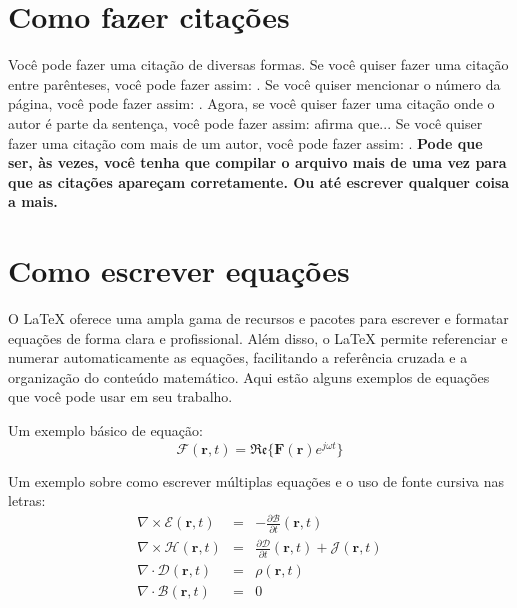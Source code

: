 
	\chapter{Como fazer citações}

		Você pode fazer uma citação de diversas formas. Se você quiser fazer uma citação entre parênteses, você pode fazer assim: \citep{milgram1969note}. Se você quiser mencionar o número da página, você pode fazer assim: \citep[p. 10]{deb2002fast}. Agora, se você quiser fazer uma citação onde o autor é parte da sentença, você pode fazer assim: \cite{maxwell1865viii} afirma que... Se você quiser fazer uma citação com mais de um autor, você pode fazer assim: \citep{van2019fantastic,maxwell1865viii}. \textbf{Pode que ser, às vezes, você tenha que compilar o arquivo mais de uma vez para que as citações apareçam corretamente. Ou até escrever qualquer coisa a mais.}
	
	\chapter{Como escrever equações}

		O LaTeX oferece uma ampla gama de recursos e pacotes para escrever e formatar equações de forma clara e profissional. Além disso, o LaTeX permite referenciar e numerar automaticamente as equações, facilitando a referência cruzada e a organização do conteúdo matemático. Aqui estão alguns exemplos de equações que você pode usar em seu trabalho.

		Um exemplo básico de equação:
		\begin{equation}
			\boldsymbol{\mathcal{F}}(\mathbf{r}, t) = \mathfrak{Re}\{\mathbf{F}(\mathbf{r})e^{j\omega t}\} \label{eq:2:fourier}
		\end{equation}

		Um exemplo sobre como escrever múltiplas equações e o uso de fonte cursiva nas letras:
		\begin{eqnarray}
			\nabla\times\boldsymbol{\mathcal{E}}(\mathbf{r}, t) &=& - \frac{\partial\boldsymbol{ \mathcal{B}}}{\partial t}(\mathbf{r}, t) \label{eq:2:maxwell:time:1} \\
			\nabla\times\boldsymbol{\mathcal{H}}(\mathbf{r}, t) &=& \frac{\partial\boldsymbol{ \mathcal{D}}}{\partial t}(\mathbf{r}, t) + \boldsymbol{\mathcal{J}}(\mathbf{r}, t) \label{eq:2:maxwell:time:2} \\
			\nabla\cdot\boldsymbol{\mathcal{D}}(\mathbf{r}, t) &=& \rho(\mathbf{r}, t) \label{eq:2:maxwell:time:3} \\
			\nabla\cdot\boldsymbol{\mathcal{B}}(\mathbf{r}, t) &=& 0 \label{eq:2:maxwell:time:4}
		\end{eqnarray}

